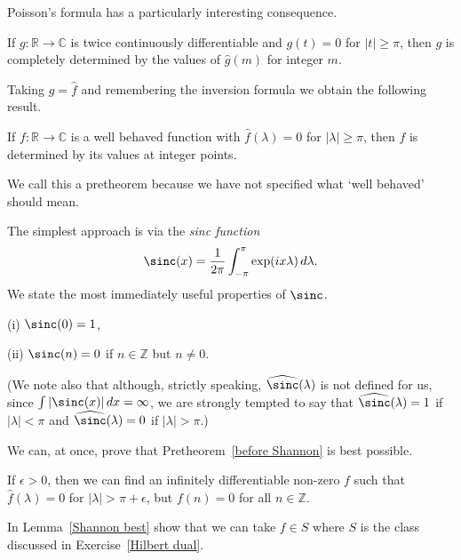 Poisson's formula has a particularly interesting consequence.
\begin{lemma} If $g:{\mathbb R}\rightarrow{\mathbb C}$
is twice continuously differentiable and
$g(t)=0$ for $|t|\geq \pi$, then $g$ is completely
determined by the values of $\hat{g}(m)$ for
integer $m$.
\end{lemma}
Taking $g=\hat{f}$ and remembering the inversion formula
we obtain the following result.
\begin{pretheorem}\label{before Shannon}
If $f:{\mathbb R}\rightarrow{\mathbb C}$
is a well behaved function with $\hat{f}(\lambda)=0$
for $|\lambda|\geq\pi$,
then $f$ is determined by its values at integer
points.
\end{pretheorem}
We call this a pretheorem because we have not specified
what `well behaved' should mean.

The simplest approach is via the \emph{sinc function}
\[\sinc(x)=\frac{1}{2\pi}\int_{-\pi}^{\pi}\exp(ix\lambda)\,d\lambda.\]
We state the most immediately useful properties
of  $\sinc$.
\begin{lemma}
(i) $\sinc(0)=1$,

(ii) $\sinc(n)=0$ if $n\in{\mathbb Z}$ but $n\neq 0$.
\end{lemma}

(We note also that although, strictly speaking,
$\widehat{\sinc}(\lambda)$ is not defined
for us, since $\int|\sinc (x)|\,dx=\infty$,
we are strongly tempted to say that
$\widehat{\sinc}(\lambda)=1$ if $|\lambda|<\pi$
and
$\widehat{\sinc}(\lambda)=0$ if $|\lambda|>\pi$.)

We can, at once, prove that Pretheorem~\ref{before Shannon}
is best possible.
\begin{lemma}\label{Shannon best}
If $\epsilon>0$, then we can find an
infinitely differentiable non-zero $f$ such that
$\hat{f}(\lambda)=0$ for $|\lambda|>\pi+\epsilon$,
but $f(n)=0$ for all $n\in{\mathbb Z}$.
\end{lemma}
\begin{exercise} In Lemma~\ref{Shannon best} show that
we can take $f\in S$ where $S$ is the class discussed in
Exercise~\ref{Hilbert dual}.
\end{exercise}

